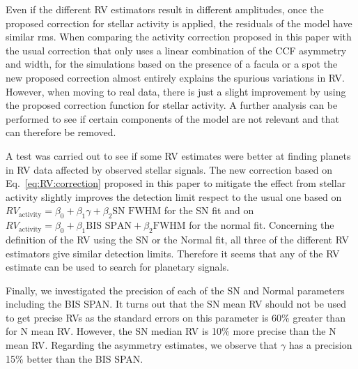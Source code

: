\documentclass{aa}
\begin{document}
Even if the different RV estimators result in different amplitudes, once the proposed correction for stellar activity is applied, the residuals of the model have similar rms.
When comparing the activity correction proposed in this paper with the usual correction that only uses a linear combination of the CCF asymmetry and width, for the simulations based on the presence of a facula or a spot the new proposed correction almost entirely explains the spurious variations in RV. However, when moving to real data, there is just a slight improvement by using the proposed correction function for stellar activity. 
A further analysis can be performed to see if certain components of the model are not relevant and that can therefore be removed.

A test was carried out to see if some RV estimates were better at finding planets in RV data affected by observed stellar signals. The new correction based on Eq.~\eqref{eq:RV:correction} proposed in this paper to mitigate the effect from stellar activity slightly improves the detection limit respect to the usual one based on $RV_{\text{activity}}=\beta_0+\beta_1 \gamma + \beta_2 \text{SN FWHM}$ for the SN fit and on $RV_{\text{activity}}=\beta_0+\beta_1 \text{BIS SPAN} + \beta_2 \text{FWHM}$ for the normal fit.
Concerning the definition of the RV using the SN or the Normal fit, all three of the different RV estimators give similar detection limits. Therefore it seems that any of the RV estimate can be used to search for planetary signals.

Finally, we investigated the precision of each of the SN and Normal parameters including the BIS SPAN. It turns out that the SN mean RV should not be used to get precise RVs as the standard errors on this parameter is 60\% greater than for N mean RV. 
However, the SN median RV is 10\% more precise than the N mean RV. 
Regarding the asymmetry estimates, we observe that $\gamma$ has a precision 15\% better than the BIS SPAN.








\end{document}
